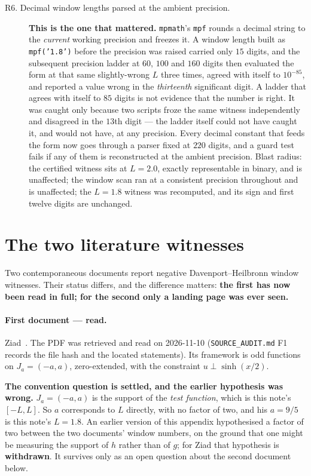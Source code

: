 \documentclass[11pt,a4paper]{article}
\theoremstyle{definition}
\theoremstyle{remark}
\newcommand{\src}[1]{{\footnotesize\texttt{#1}}}
\begin{document}
\begin{description}
\item[R6. Decimal window lengths parsed at the ambient precision.] \textbf{This is the one
that mattered.} \texttt{mpmath}'s \texttt{mpf} rounds a decimal string to the
\emph{current} working precision and freezes it. A window length built as
\texttt{mpf('1.8')} before the precision was raised carried only $15$ digits, and the
subsequent precision ladder at $60$, $100$ and $160$ digits then evaluated the form at
that same slightly-wrong $L$ three times, agreed with itself to $10^{-85}$, and reported
a value wrong in the \emph{thirteenth} significant digit. A ladder that agrees with
itself to $85$ digits is not evidence that the number is right. It was caught only
because two scripts froze the same witness independently and disagreed in the $13$th
digit --- the ladder itself could not have caught it, and would not have, at any
precision. Every decimal constant that feeds the form now goes through a parser fixed at
$220$ digits, and a guard test fails if any of them is reconstructed at the ambient
precision. Blast radius: the certified witness sits at $L=2.0$, exactly representable in
binary, and is unaffected; the window scan ran at a consistent precision throughout and is
unaffected; the $L=1.8$ witness was recomputed, and its sign and first twelve digits are
unchanged.
\end{description}

\section{The two literature witnesses}\label{app:lit}

Two contemporaneous documents report negative Davenport--Heilbronn window witnesses.
Their status differs, and the difference matters: \textbf{the first has now been read in
full; for the second only a landing page was ever seen.}

\paragraph{First document --- read.} Ziad~\cite{Ziad}. The PDF was retrieved and read on
2026-11-10 (\src{SOURCE\_AUDIT.md} F1 records the file hash and the located statements).
Its framework is odd functions on $J_a = (-a,a)$, zero-extended, with the constraint
$u \perp \sinh(x/2)$.

\textbf{The convention question is settled, and the earlier hypothesis was wrong.}
$J_a = (-a,a)$ is the support of the \emph{test function}, which is this note's $[-L,L]$.
So $a$ corresponds to $L$ directly, with no factor of two, and his $a = 9/5$ is this
note's $L = 1.8$. An earlier version of this appendix hypothesised a factor of two
between the two documents' window numbers, on the ground that one might be measuring the
support of $h$ rather than of $g$; for Ziad that hypothesis is \textbf{withdrawn}. It
survives only as an open question about the second document below.
\end{document}
